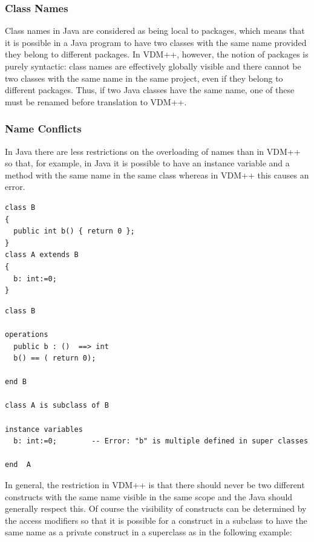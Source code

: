 \documentclass[\pformat,12pt]{article}
\begin{document}
\subsubsection{Class Names}

Class names in Java are considered as being local to packages, which
means that it is possible in a Java program to have two classes with
the same name provided they belong to different packages. In VDM++,
however,  the notion of packages is purely syntactic: class
names are effectively globally visible and there cannot be two classes
with the same name in the same project, even if they belong to
different packages. Thus, if two Java classes have the same name, one
of these must be renamed before translation to VDM++.

\subsubsection{Name Conflicts}

In Java there are less restrictions on the overloading of names than
in VDM++ so that, for example, in Java it is possible to have an instance
variable and a method with the same name in the same class  whereas in
VDM++ this causes an error.  

\begin{small}
\begin{verbatim}
class B
{
  public int b() { return 0 };
}
class A extends B
{ 
  b: int:=0;
}
\end{verbatim}
\end{small}

\begin{small}
\begin{verbatim}
class B

operations
  public b : ()  ==> int
  b() == ( return 0);

end B

class A is subclass of B

instance variables
  b: int:=0;        -- Error: "b" is multiple defined in super classes

end  A
\end{verbatim}
\end{small}

In general, the restriction in VDM++ is that there should never be two
different constructs with the same name visible in the same scope and
the Java should generally respect this. Of course the visibility of
constructs can be determined by the access modifiers so that it is
possible for a construct in a subclass to have the same name as a
private construct in a superclass as in the following example:
\end{document}
